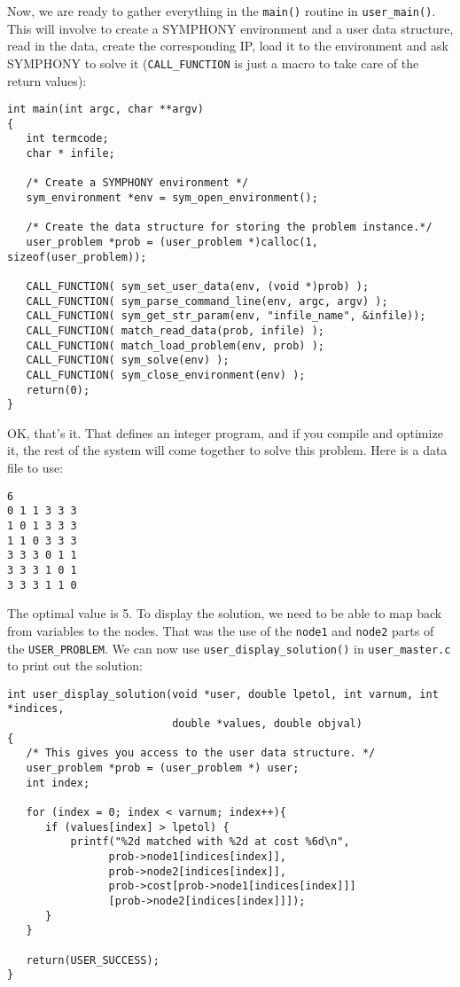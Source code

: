 \documentclass[11pt]{article}
\begin{document}
Now, we are ready to gather everything in the \texttt{main()} routine in 
\texttt{user\_main()}. This will involve to create a SYMPHONY environment and 
a user data structure, read in the data, create the corresponding IP, 
load it to the environment and ask SYMPHONY to solve it 
(\texttt{CALL\_FUNCTION} is just a macro to take care of the return values):  

\begin{verbatim}
int main(int argc, char **argv)
{
   int termcode;
   char * infile;

   /* Create a SYMPHONY environment */
   sym_environment *env = sym_open_environment();

   /* Create the data structure for storing the problem instance.*/
   user_problem *prob = (user_problem *)calloc(1, sizeof(user_problem));
   
   CALL_FUNCTION( sym_set_user_data(env, (void *)prob) );
   CALL_FUNCTION( sym_parse_command_line(env, argc, argv) );
   CALL_FUNCTION( sym_get_str_param(env, "infile_name", &infile));
   CALL_FUNCTION( match_read_data(prob, infile) );
   CALL_FUNCTION( match_load_problem(env, prob) );
   CALL_FUNCTION( sym_solve(env) );
   CALL_FUNCTION( sym_close_environment(env) );
   return(0);
}
\end{verbatim}

OK, that's it. That defines an integer program, and if you compile and
optimize it, the rest of the system will come together to solve this problem.
Here is a data file to use:
\begin{verbatim}
6
0 1 1 3 3 3
1 0 1 3 3 3
1 1 0 3 3 3
3 3 3 0 1 1
3 3 3 1 0 1
3 3 3 1 1 0
\end{verbatim}

The optimal value is 5. To display the solution, we need to be able to map
back from variables to the nodes. That was the use of the \texttt{node1} and
\texttt{node2} parts of the \texttt{USER\_PROBLEM}. We can now use
\texttt{user\_display\_solution()} in \texttt{user\_master.c} to print 
out the solution:

\begin{verbatim}
int user_display_solution(void *user, double lpetol, int varnum, int *indices,
                          double *values, double objval)
{
   /* This gives you access to the user data structure. */
   user_problem *prob = (user_problem *) user;
   int index;
 
   for (index = 0; index < varnum; index++){
      if (values[index] > lpetol) {
          printf("%2d matched with %2d at cost %6d\n",
                prob->node1[indices[index]],
                prob->node2[indices[index]],
                prob->cost[prob->node1[indices[index]]]
                [prob->node2[indices[index]]]);
      }	   
   }
   
   return(USER_SUCCESS);
}
\end{verbatim}
\end{document}
